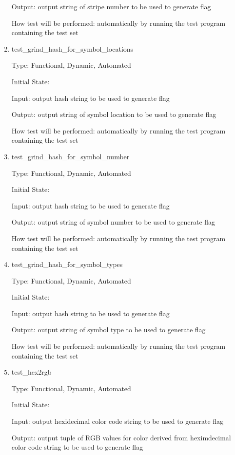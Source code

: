 \documentclass[12pt, titlepage]{article}
\begin{document}
\begin{enumerate}
Output: output string of stripe number to be used to generate flag

How test will be performed: automatically by running the test program
containing the test set

\item{test\_grind\_hash\_for\_symbol\_locations\\}

Type: Functional, Dynamic, Automated

Initial State:

Input: output hash string to be used to generate flag

Output: output string of symbol location to be used to generate flag

How test will be performed: automatically by running the test program
containing the test set

\item{test\_grind\_hash\_for\_symbol\_number\\}

Type: Functional, Dynamic, Automated

Initial State:

Input: output hash string to be used to generate flag

Output: output string of symbol number to be used to generate flag

How test will be performed: automatically by running the test program
containing the test set

\item{test\_grind\_hash\_for\_symbol\_types\\}

Type: Functional, Dynamic, Automated

Initial State:

Input: output hash string to be used to generate flag

Output: output string of symbol type to be used to generate flag

How test will be performed: automatically by running the test program
containing the test set

\item{test\_hex2rgb\\}

Type: Functional, Dynamic, Automated

Initial State:

Input: output hexidecimal color code string to be used to generate flag

Output: output tuple of RGB values for color derived from heximdecimal color
code string to be used to generate flag


\end{enumerate}
\end{document}
